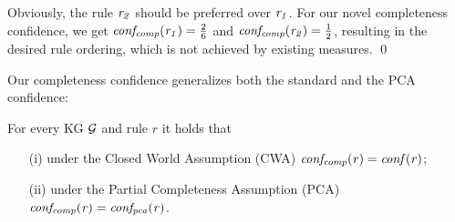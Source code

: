 \begin{example}\label{ex:fam_grad}
\label{ex:conf_comp}
Obviously, the rule $\mathit{r_2}$ %
should be preferred over $\mathit{r_1}$. For our novel %
completeness confidence, we get %
$\mathit{conf_{comp}(r_1)}=\frac{2}{6}$ %
and $\mathit{conf_{comp}(r_2)}=\frac{1}{2}$, resulting in the desired rule ordering,  which is not achieved by %
existing measures. %
\qed




\end{example}

Our completeness confidence generalizes both 
the standard %
and the PCA confidence:

\begin{proposition}
For every KG $\mathcal{G}$ and rule $r$ it holds that 
\begin{itemize}
\item[(i)] under the Closed World Assumption (CWA) $\mathit{conf_{comp}(r)=conf(r)}$;
\item[(ii)] under the Partial Completeness Assumption (PCA) $\mathit{conf_{comp}(r)=conf_{pca}(r)}$.
\end{itemize}
\end{proposition}

